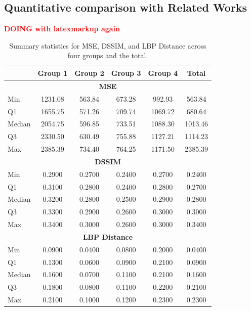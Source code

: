 \documentclass{ieeeaccess}
\begin{document}
\subsection{Quantitative comparison with Related Works}
\vspace{5mm} { \textcolor{red} {\textbf{DOING with latexmarkup again}}}  \vspace{5mm}



\begin{table}[h!]
\centering
\begin{tabular}{|l|c|c|c|c|c|}
\hline
& \textbf{Group 1} & \textbf{Group 2} & \textbf{Group 3} & \textbf{Group 4} & \textbf{Total} \\
\hline
\multicolumn{6}{|c|}{\textbf{MSE}} \\
\hline
Min     & 1231.08 & 563.84 & 673.28 & 992.93 & 563.84 \\
Q1      & 1655.75 & 571.26 & 709.74 & 1069.72 & 680.64 \\
Median  & 2054.75 & 596.85 & 733.51 & 1088.30 & 1013.46 \\
Q3      & 2330.50 & 630.49 & 755.88 & 1127.21 & 1114.23 \\
Max     & 2385.39 & 734.40 & 764.25 & 1171.50 & 2385.39 \\
\hline
\multicolumn{6}{|c|}{\textbf{DSSIM}} \\
\hline
\hline
Min     & 0.2900 & 0.2700 & 0.2400 & 0.2700 & 0.2400 \\
Q1      & 0.3100 & 0.2800 & 0.2400 & 0.2800 & 0.2700 \\
Median  & 0.3200 & 0.2800 & 0.2500 & 0.2900 & 0.2800 \\
Q3      & 0.3300 & 0.2900 & 0.2600 & 0.3000 & 0.3000 \\
Max     & 0.3400 & 0.3000 & 0.2600 & 0.3000 & 0.3400 \\
\hline
\multicolumn{6}{|c|}{\textbf{LBP Distance}} \\
\hline
\hline
Min     & 0.0900 & 0.0400 & 0.0800 & 0.2000 & 0.0400 \\
Q1      & 0.1300 & 0.0600 & 0.0900 & 0.2100 & 0.0900 \\
Median  & 0.1600 & 0.0700 & 0.1100 & 0.2100 & 0.1600 \\
Q3      & 0.1800 & 0.0800 & 0.1100 & 0.2200 & 0.2100 \\
Max     & 0.2100 & 0.1000 & 0.1200 & 0.2300 & 0.2300 \\
\hline
\end{tabular}
\caption{Summary statistics for MSE, DSSIM, and LBP Distance across four groups and the total.}
\label{tab:metrics_summary}
\end{table}
\end{document}
